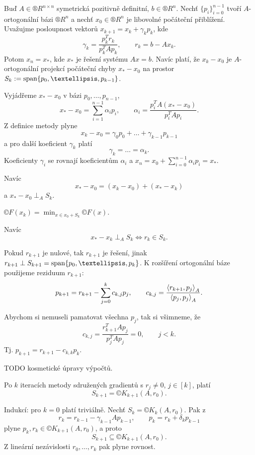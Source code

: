 \documentclass[12pt]{article}					%
\begin{document}
\begin{veta}
	Buď $A \in ®R^{n \times n}$ symetrická pozitivně definitní, $b \in ®R^n$. Nechť $\{p_i\}_{i=0}^{n-1}$ tvoří $A$-ortogonální bázi $®R^n$ a nechť $x_0 \in ®R^n$ je libovolné počáteční přiblížení. Uvažujme posloupnost vektorů $x_{k+1} = x_k + \gamma_k p_k$, kde
	$$ \gamma_k = \frac{p_k^T r_k}{p_k^T Ap_k}, \qquad r_k = b - Ax_k. $$
	Potom $x_n = x_*$, kde $x_*$ je řešení systému $Ax = b$. Navíc platí, že $x_k - x_0$ je $A$-ortogonální projekcí počáteční chyby $x_* - x_0$ na prostor $S_k := \spn\{p_0, …, p_{k-1}\}$.

	\begin{dukazin}
		Vyjádřeme $x_* - x_0$ v bázi $p_0, …, p_{n-1}$,
		$$ x_* - x_0 = \sum_{i=1}^{n-1} \alpha_i p_i, \qquad \alpha_i = \frac{p_i^T A (x_* - x_0)}{p_i^T A p_i}. $$
		Z definice metody plyne
		$$ x_k - x_0 = \gamma_0 p_0 + … + \gamma_{k-1}p_{k-1} $$
		a pro další koeficient $\gamma_k$ platí
		$$ \gamma_k = … = \alpha_k. $$
		Koeficienty $\gamma_i$ se rovnají koeficientům $\alpha_i$ a $x_n = x_0 + \sum_{i=0}^{n-1} \alpha_i p_i = x_*$.

		Navíc
		$$ x_* - x_0 = (x_k - x_0) + (x_* - x_k) $$
		a $x_* - x_0 \perp_A S_k$.
	\end{dukazin}
\end{veta}

\begin{dusledek}
	$©F(x_k) = \min_{x \in x_0 + S_k} ©F(x)$.

	Navíc
	$$ x_* - x_k \perp_A S_k \Leftrightarrow r_k \in S_k. $$
\end{dusledek}

\begin{poznamka}
	Pokud $r_{k+1}$ je nulové, tak $r_{k+1}$ je řešení, jinak $r_{k+1} \perp S_{k+1} = \spn \{p_0, …, p_k\}$. K rozšíření ortogonální báze použijeme reziduum $r_{k+1}$:
	$$ p_{k+1} = r_{k+1} - \sum_{j=0}^k c_{k, j}p_j, \qquad c_{k, j} = \frac{\left\langle r_{k+1}, p_j\right\rangle_A}{\left\langle p_j, p_j\right\rangle_A}. $$

	Abychom si nemuseli pamatovat všechna $p_j$, tak si všimneme, že
	$$ c_{k, j} = \frac{r_{k+1}^T A p_j}{p_j^T A p_j} = 0, \qquad j < k. $$
	Tj. $p_{k+1} = r_{k+1} - c_{k, k}p_k$.

	TODO kosmetické úpravy výpočtů.
\end{poznamka}

\begin{lemma}
	Po $k$ iteracích metody sdružených gradientů s $r_j ≠ 0$, $j \in [k]$, platí
	$$ S_{k+1} = ©K_{k+1}(A, r_0). $$

	\begin{dukazin}
		Indukcí: pro $k = 0$ platí triviálně. Nechť $S_k = ©K_k(A, r_0)$. Pak z
		$$ r_k = r_{k-1} - \gamma_{k-1} A p_{k-1}, \qquad p_k = r_k + \delta_k p_{k-1} $$
		plyne $p_k, r_k \in ©K_{k+1}(A, r_0)$, a proto
		$$ S_{k+1} \subseteq ©K_{k+1}(A, r_0). $$
		Z lineární nezávislosti $r_0, …, r_k$ pak plyne rovnost.
	\end{dukazin}
\end{lemma}
\end{document}
